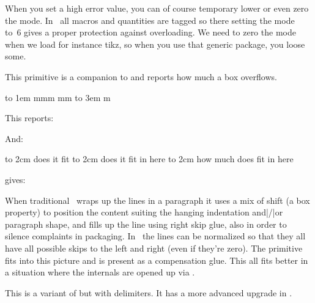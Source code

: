 When you set a high error value, you can of course temporary lower or even zero
the mode. In \CONTEXT\ all macros and quantities are tagged so there setting the
mode to~6 gives a proper protection against overloading. We need to zero the mode
when we load for instance tikz, so when you use that generic package, you loose
some.

\stopnewprimitive

\startnewprimitive[title={\prm {overshoot}}]

This primitive is a companion to  and reports how much a box
overflows.

\startbuffer
{}\hbox to 1em {mmm} \the\badness\quad\the\overshoot
{}\hbox         {mm} \the\badness\quad\the\overshoot
{}\hbox to 3em   {m} \the\badness\quad\the\overshoot
\stopbuffer

\typebuffer

This reports:

\startlines
\getbuffer
\stoplines

And:

\startbuffer
\hbox to 2cm {does it fit}               \the\overshoot
\hbox to 2cm {does it fit in here}       \the\overshoot
\hbox to 2cm {how much does fit in here} \the\overshoot
\stopbuffer

\typebuffer

gives:

\startlines
\getbuffer
\stoplines

When traditional \TEX\ wraps up the lines in a paragraph it uses a mix of shift
(a box property) to position the content suiting the hanging indentation and|/|or
paragraph shape, and fills up the line using right skip glue, also in order to
silence complaints in packaging. In \LUAMETATEX\ the lines can be normalized so
that they all have all possible skips to the left and right (even if they're
zero). The  primitive fits into this picture and is present as a
compensation glue. This all fits better in a situation where the internals are
opened up via \LUA.

\stopnewprimitive

\startoldprimitive[title={\prm {overwithdelims}}][obsolete=yes]

This is a variant of  but with delimiters. It has a more advanced
upgrade in .

\stopoldprimitive

\startnewprimitive[title={\prm {pageboundary}}]


